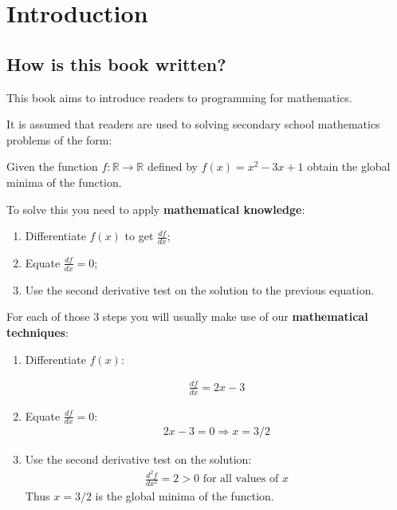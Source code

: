 \chapter{Introduction}

\section{How is this book written?}

This book aims to introduce readers to programming for mathematics.

It is assumed that readers are used to solving secondary school mathematics problems
of the form:


Given the function \(f:\mathbb{R}\to\mathbb{R}\) defined by
\(f(x) = x ^ 2 - 3 x + 1\) obtain the global minima of the function.


To solve this you need to apply \textbf{mathematical knowledge}:

\begin{enumerate}
    \item Differentiate \(f(x)\) to get \(\frac{df}{dx}\);
    \item Equate \(\frac{df}{dx}=0\);
    \item Use the second derivative test on the solution to the previous equation.
\end{enumerate}

For each of those 3 steps you will usually make use of our \textbf{mathematical
techniques}:
\begin{enumerate}
\item Differentiate \(f(x)\):

\begin{equation*}
\begin{split}\frac{df}{dx} = 2 x - 3\end{split}
\end{equation*}
\item Equate \(\frac{df}{dx}=0\):
\begin{equation*}
\begin{split}2x-3 =0 \Rightarrow x = 3/2\end{split}
\end{equation*}
\item Use the second derivative test on the solution:
\begin{equation*}
\begin{split}\frac{d^2f}{dx^2} = 2 > 0\text{ for all values of }x\end{split}
\end{equation*}
Thus \(x=3/2\) is the global minima of the function.

\end{enumerate}

